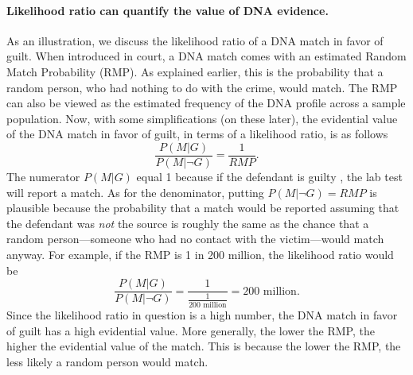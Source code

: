 \documentclass[10pt]{article}
\begin{document}
\paragraph{Likelihood ratio can quantify the value of DNA evidence.}



As an illustration, we discuss the likelihood ratio 
of a DNA match in favor of guilt. %
When introduced in court, a DNA match comes with an 
estimated Random Match Probability (RMP).  As explained earlier, this
is the probability that a random person, who 
had nothing to do with the crime, would match. The RMP can also be viewed 
as the estimated frequency of the DNA profile across a sample population. 
%
Now, with some simplifications (on these later), 
the evidential value of the DNA 
match in favor of guilt, in terms of a likelihood ratio, 
is as follows %
%
\[
\frac{P(M | G)}{P(M | \neg G)} =   \frac{1}{RMP}.
\]
%
The numerator $P(M | G)$ equal 1 because %
if the defendant is guilty%
, the lab test will report a match. As for the denominator, 
putting $P(M | \neg G)=RMP$ is plausible because the probability that a match would be reported assuming that the defendant was \textit{not} 
the source is roughly the same as the chance that a random person---someone who had no contact with the victim---would match anyway. 
For example, if the RMP is 1 in 200 million, the likelihood ratio would be
%
\[\frac{P(M |G)}{P( M | \neg G)}=\frac{1}{\frac{1}{\text{200 million}}}=\text{200 million}.\]
%
Since the likelihood ratio in question is a high number, the DNA match in favor of guilt 
has a high evidential value. More generally,  the lower the RMP, the higher the evidential value of the match. This is because 
the lower the RMP, the less likely a random person would match. 
\end{document}
